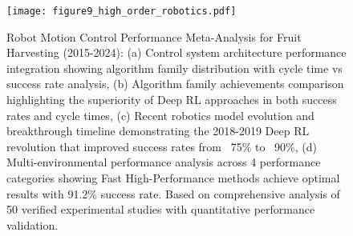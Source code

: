 \documentclass{ieeeaccess}
\begin{document}
\begin{figure}[htbp]
\centering
\texttt{[image: figure9\_high\_order\_robotics.pdf]}
\caption{Robot Motion Control Performance Meta-Analysis for Fruit Harvesting (2015-2024): (a) Control system architecture performance integration showing algorithm family distribution with cycle time vs success rate analysis, (b) Algorithm family achievements comparison highlighting the superiority of Deep RL approaches in both success rates and cycle times, (c) Recent robotics model evolution and breakthrough timeline demonstrating the 2018-2019 Deep RL revolution that improved success rates from ~75\% to ~90\%, (d) Multi-environmental performance analysis across 4 performance categories showing Fast High-Performance methods achieve optimal results with 91.2\% success rate. Based on comprehensive analysis of 50 verified experimental studies with quantitative performance validation.}
\label{fig:motion_planning_analysis}
\end{figure}
\end{document}

